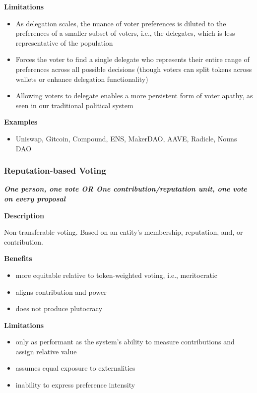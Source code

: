 \documentclass[
]{article}
\providecommand{\tightlist}{%
  \setlength{\itemsep}{0pt}\setlength{\parskip}{0pt}}
\begin{document}
\textbf{Limitations}

\begin{itemize}
\tightlist
\item
  As delegation scales, the nuance of voter preferences is diluted to
  the preferences of a smaller subset of voters, i.e., the delegates,
  which is less representative of the population
\item
  Forces the voter to find a single delegate who represents their entire
  range of preferences across all possible decisions (though voters can
  split tokens across wallets or enhance delegation functionality)
\item
  Allowing voters to delegate enables a more persistent form of voter
  apathy, as seen in our traditional political system
\end{itemize}

\textbf{Examples}

\begin{itemize}
\tightlist
\item
  Uniswap, Gitcoin, Compound, ENS, MakerDAO, AAVE, Radicle, Nouns DAO
\end{itemize}

\hypertarget{reputation-based-voting}{%
\subsubsection{Reputation-based Voting}\label{reputation-based-voting}}

\textbf{\emph{One person, one vote OR One contribution/reputation unit,
one vote on every proposal}}

\textbf{Description}

Non-transferable voting. Based on an entity's membership, reputation,
and, or contribution.

\textbf{Benefits}

\begin{itemize}
\tightlist
\item
  more equitable relative to token-weighted voting, i.e., meritocratic
\item
  aligns contribution and power
\item
  does not produce plutocracy
\end{itemize}

\textbf{Limitations}

\begin{itemize}
\tightlist
\item
  only as performant as the system's ability to measure contributions
  and assign relative value
\item
  assumes equal exposure to externalities
\item
  inability to express preference intensity
\end{itemize}
\end{document}
